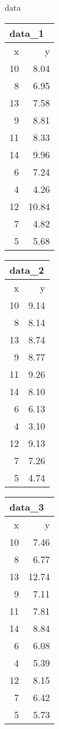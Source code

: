 \documentclass[
  ignorenonframetext,
]{beamer}
\begin{document}
\begin{frame}{data}
\protect\hypertarget{data-1}{}
\begin{tabular}{rr}
\multicolumn{2}{l}{data\_1}\\
\toprule
x & y\\
\midrule
10 & 8.04\\
8 & 6.95\\
13 & 7.58\\
9 & 8.81\\
11 & 8.33\\
14 & 9.96\\
6 & 7.24\\
4 & 4.26\\
12 & 10.84\\
7 & 4.82\\
5 & 5.68\\
\bottomrule
\end{tabular}\hfill
\begin{tabular}{rr}
\multicolumn{2}{l}{data\_2}\\
\toprule
x & y\\
\midrule
10 & 9.14\\
8 & 8.14\\
13 & 8.74\\
9 & 8.77\\
11 & 9.26\\
14 & 8.10\\
6 & 6.13\\
4 & 3.10\\
12 & 9.13\\
7 & 7.26\\
5 & 4.74\\
\bottomrule
\end{tabular}\hfill
\begin{tabular}{rr}
\multicolumn{2}{l}{data\_3}\\
\toprule
x & y\\
\midrule
10 & 7.46\\
8 & 6.77\\
13 & 12.74\\
9 & 7.11\\
11 & 7.81\\
14 & 8.84\\
6 & 6.08\\
4 & 5.39\\
12 & 8.15\\
7 & 6.42\\
5 & 5.73\\
\bottomrule
\end{tabular}\hfill
\begin{tabular}{rr}

\end{tabular}
\end{frame}
\end{document}
